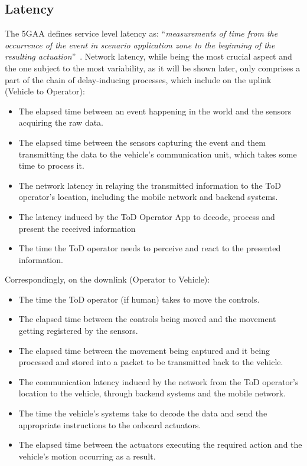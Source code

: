 \subsection{Latency}
The 5GAA defines service level latency as: ``\textit{measurements of time from the occurrence of the event in scenario application zone to the beginning of the resulting actuation}''~\cite{5gaa_tod_system_requirements_architecture}.
Network latency, while being the most crucial aspect and the one subject to the most variability, as it will be shown later, only comprises a part of the chain of delay-inducing processes, which include on the uplink (Vehicle to Operator):
\begin{itemize}
    \item The elapsed time between an event happening in the world and the sensors acquiring the raw data.
    \item The elapsed time between the sensors capturing the event and them transmitting the data to the vehicle's communication unit, which takes some time to process it.
    \item The network latency in relaying the transmitted information to the ToD operator's location, including the mobile network and backend systems.
    \item The latency induced by the ToD Operator App to decode, process and present the received information
    \item The time the ToD operator needs to perceive and react to the presented information.
\end{itemize}
Correspondingly, on the downlink (Operator to Vehicle):
\begin{itemize}
    \item The time the ToD operator (if human) takes to move the controls.
    \item The elapsed time between the controls being moved and the movement getting registered by the sensors.
    \item The elapsed time between the movement being captured and it being processed and stored into a packet to be transmitted back to the vehicle.
    \item The communication latency induced by the network from the ToD operator's location to the vehicle, through backend systems and the mobile network.
    \item The time the vehicle's systems take to decode the data and send the appropriate instructions to the onboard actuators.
    \item The elapsed time between the actuators executing the required action and the vehicle's motion occurring as a result.
\end{itemize}
